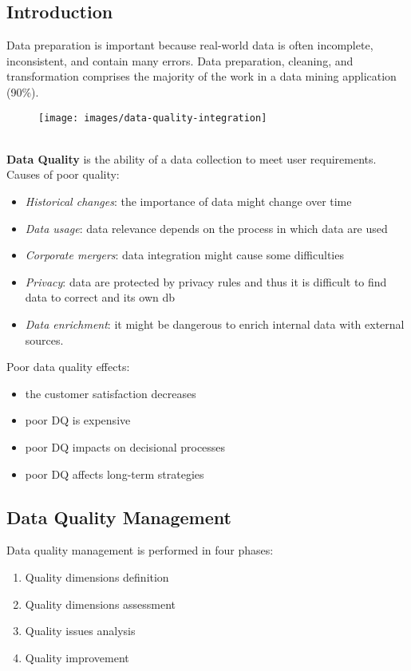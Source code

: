 \documentclass[10pt,a4paper]{article}
\begin{document}
\subsection{Introduction}
Data preparation is important because real-world data is often incomplete, inconsistent, and contain many errors. Data preparation, cleaning, and transformation comprises the majority of the work in a data mining application (90\%).
\begin{figure}[htp]
\centering
\texttt{[image: images/data-quality-integration]}\hfill
\end{figure} \\
\textbf{Data Quality} is the ability of a data collection to meet user requirements. 
Causes of poor quality:
\begin{itemize}
	\item \textit{Historical changes}: the importance of data might change over time
	\item \textit{Data usage}: data relevance depends on the process in which data are used
	\item \textit{Corporate mergers}: data integration might cause some difficulties
	\item \textit{Privacy}: data are protected by privacy rules and thus it is difficult to find data to correct and its own db
	\item \textit{Data enrichment}: it might be dangerous to enrich internal data with external sources.
\end{itemize}
Poor data quality effects:
\begin{itemize}
	\item the customer satisfaction decreases
	\item poor DQ is expensive
	\item poor DQ impacts on decisional processes
	\item poor DQ affects long-term strategies
\end{itemize}
\subsection{Data Quality Management}
Data quality management is performed in four phases:
\begin{enumerate}
	\item Quality dimensions definition
	\item Quality dimensions assessment
	\item Quality issues analysis
	\item Quality improvement
\end{enumerate}
\end{document}

